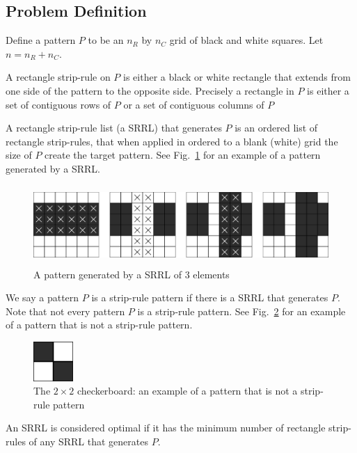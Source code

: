 \subsection{Problem Definition}

Define a pattern $P$ to be an $n_{R} $ by $n_{C}$ grid of black and white squares. Let $n = n_R + n_C$.


A rectangle strip-rule on $P$ is either a black or white rectangle that extends from one side of the pattern to the opposite side.
Precisely a rectangle in $P$ is either a set of contiguous rows of $P$ or a set of contiguous columns of $P$

A rectangle strip-rule list (a SRRL) that generates $P$ is an ordered list of rectangle strip-rules, that when applied in ordered to a blank (white) grid the size of $P$ create the target pattern. See Fig.~\ref{fig:pattern_generation} for an example of a pattern generated by a SRRL.

\begin{figure}[h]
\centering
\includegraphics[height=3cm]{pattern_generation}
\caption{A pattern generated by a SRRL of 3 elements}
\label{fig:pattern_generation}
\end{figure}

We say a pattern $P$ is a strip-rule pattern if there is a SRRL that generates $P$. Note that not every pattern $P$ is a strip-rule pattern. See Fig.~\ref{fig:checkerboard} for an example of a pattern that is not a strip-rule pattern.

\begin{figure}[h]
\centering
\includegraphics[width=1.5cm]{checkerboard}
\caption{The $2 \times 2$ checkerboard: an example of a pattern that is not a strip-rule pattern}
\label{fig:checkerboard}
\end{figure}


An SRRL is considered optimal if it has the minimum number of rectangle strip-rules of any SRRL that generates $P$.
